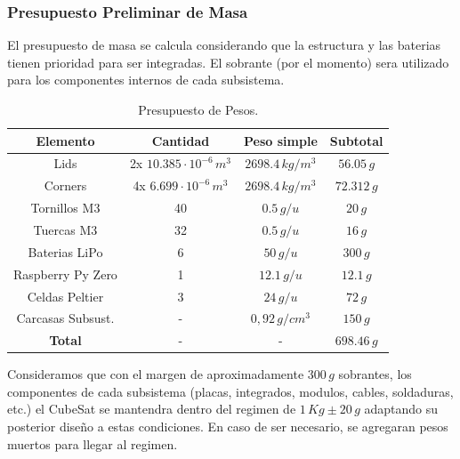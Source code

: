     \subsubsection{Presupuesto Preliminar de Masa}
      El presupuesto de masa se calcula considerando que la estructura y las baterias tienen prioridad para ser
      integradas. El sobrante (por el momento) sera utilizado para los componentes internos de cada subsistema.
      \begin{table}[H]
        \centering
        \begin{tabular}{|c|c|c|c|}
          \hline
          \textbf{Elemento} & \textbf{Cantidad}                 & \textbf{Peso simple}  & \textbf{Subtotal} \\ \hline
          Lids              & 2x $10.385 \cdot 10^{-6} \, m^3$  & $2698.4 \, kg/m^3$    & $56.05 \, g$ \\ \hline
          Corners           & 4x $6.699 \cdot 10^{-6} \, m^3$   & $2698.4 \, kg/m^3$    & $72.312 \, g$ \\ \hline
          Tornillos M3      & 40                                & $0.5 \, g/u$          & $20 \, g$ \\ \hline
          Tuercas M3        & 32                                & $0.5 \, g/u$          & $16 \, g$ \\ \hline
          Baterias LiPo     & 6                                 & $50 \, g/u$           & $300 \, g$ \\ \hline
          Raspberry Py Zero & 1                                 & $12.1 \,g/u$          & $12.1 \, g$ \\ \hline
          Celdas Peltier    & 3                                 & $24 \, g/u$           & $72 \, g$ \\ \hline
          Carcasas Subsust. & -                                 & $0,92 \, g/cm^3$      & $150 \, g$ \\ \hline
          \textbf{Total}    & -                                 & -                     & $698.46 \, g$ \\ \hline
        \end{tabular}
        \caption{Presupuesto de Pesos.}
      \end{table}

      Consideramos que con el margen de aproximadamente $300 \, g$ sobrantes, los componentes de cada subsistema
      (placas, integrados, modulos, cables, soldaduras, etc.) el CubeSat se mantendra dentro del regimen de $1 \, Kg \pm
      20 \, g$ adaptando su posterior diseño a estas condiciones. En caso de ser necesario, se agregaran pesos
      muertos para llegar al regimen.

